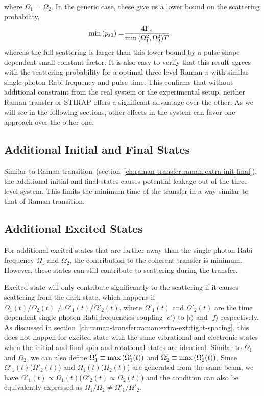 where $\Omega_1=\Omega_2$.
In the generic case, these give us a lower bound on the scattering probability,
\begin{align*}
  \min{\left({p_{\mathrm{s}0}}\right)}=&\frac{4\Gamma_e}{\min{\left({\Omega_1^2, \Omega_2^2}\right)}T}
\end{align*}
whereas the full scattering is larger than this lower bound by a pulse shape dependent
small constant factor.
It is also easy to verify that this result agrees with the scattering probability for
a optimal three-level Raman $\pi$ with similar single photon Rabi frequency and pulse time.
This confirms that without additional constraint from the real system or the experimental setup,
neither Raman transfer or STIRAP offers a significant advantage over the other.
As we will see in the following sections,
other effects in the system can favor one approach over the other one.

\subsection{Additional Initial and Final States}
\label{ch:raman-transfer:stirap:extra-init-final}

Similar to Raman transition~(section~\ref{ch:raman-transfer:raman:extra-init-final}),
the additional initial and final states causes potential leakage out of the three-level system.
This limits the minimum time of the transfer in a way similar to that of Raman transition.

\subsection{Additional Excited States}
\label{ch:raman-transfer:stirap:extra-ext}

For additional excited states that are farther away than the single photon Rabi frequency
$\Omega_1$ and $\Omega_2$, the contribution to the coherent transfer is minimum.
However, these states can still contribute to scattering during the transfer.

Excited state will only contribute significantly to the scattering if it causes scattering
from the dark state, which happens if $\Omega_1(t)/\Omega_2(t)\neq\Omega'_1(t)/\Omega'_2(t)$,
where $\Omega'_1(t)$ and $\Omega'_2(t)$ are the time dependent single photon Rabi frequencies
coupling $|e'\rangle$ to $|i\rangle$ and $|f\rangle$ respectively.
As discussed in section~\ref{ch:raman-transfer:raman:extra-ext:tight-spacing},
this does not happen for excited state with the same vibrational and electronic states
when the initial and final spin and rotational states are identical.
Similar to $\Omega_1$ and $\Omega_2$, we can also define
$\Omega'_1\equiv\max{\left({\Omega'_1(t)}\right)}$ and $\Omega'_2\equiv\max{\left({\Omega'_2(t)}\right)}$.
Since $\Omega'_1(t)$($\Omega'_2(t)$) and $\Omega_1(t)$($\Omega_2(t)$)
are generated from the same beam, we have
$\Omega'_1(t)\propto\Omega_1(t)$($\Omega'_2(t)\propto\Omega_2(t)$)
and the condition can also be equivalently expressed as
$\Omega_1/\Omega_2\neq\Omega'_1/\Omega'_2$.

